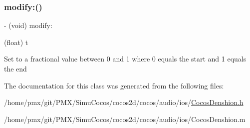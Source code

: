 \subsubsection{\texorpdfstring{modify\+:()}{modify:()}\hspace{0.1cm}{\footnotesize\ttfamily [4/4]}}
{\footnotesize\ttfamily -\/ (void) modify\+: \begin{DoxyParamCaption}\item[{(float)}]{t }\end{DoxyParamCaption}}

Set to a fractional value between 0 and 1 where 0 equals the start and 1 equals the end 

The documentation for this class was generated from the following files\+:\begin{DoxyCompactItemize}
\item 
/home/pmx/git/\+P\+M\+X/\+Simu\+Cocos/cocos2d/cocos/audio/ios/\hyperlink{cocos2d_2cocos_2audio_2ios_2CocosDenshion_8h}{Cocos\+Denshion.\+h}\item 
/home/pmx/git/\+P\+M\+X/\+Simu\+Cocos/cocos2d/cocos/audio/ios/Cocos\+Denshion.\+m\end{DoxyCompactItemize}
